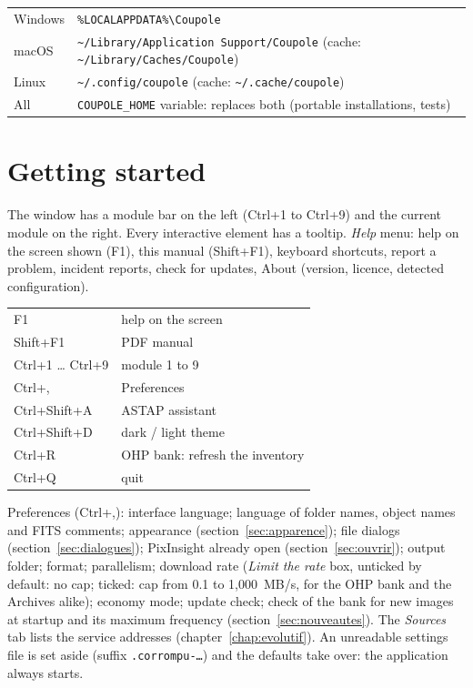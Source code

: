 \begin{center}\small
\begin{tabular}{@{}ll@{}}
\toprule
Windows & \texttt{\%LOCALAPPDATA\%\textbackslash Coupole}\\
macOS & \texttt{\textasciitilde/Library/Application Support/Coupole} (cache: \texttt{\textasciitilde/Library/Caches/Coupole})\\
Linux & \texttt{\textasciitilde/.config/coupole} (cache: \texttt{\textasciitilde/.cache/coupole})\\
All & \texttt{COUPOLE\_HOME} variable: replaces both (portable installations, tests)\\
\bottomrule
\end{tabular}
\end{center}

\section{Getting started}
The window has a module bar on the left (Ctrl+1 to Ctrl+9) and the current module on the right. Every interactive
element has a tooltip. \emph{Help} menu: help on the screen shown (F1), this manual (Shift+F1), keyboard shortcuts,
report a problem, incident reports, check for updates, About (version, licence, detected configuration).

\begin{center}\small
\begin{tabular}{@{}ll@{}}
\toprule
F1 & help on the screen\\ Shift+F1 & PDF manual\\ Ctrl+1 … Ctrl+9 & module 1 to 9\\ Ctrl+, & Preferences\\
Ctrl+Shift+A & ASTAP assistant\\ Ctrl+Shift+D & dark / light theme\\ Ctrl+R & OHP bank: refresh the inventory\\ Ctrl+Q & quit\\
\bottomrule
\end{tabular}
\end{center}

Preferences (Ctrl+,): interface language; language of folder names, object names and FITS comments;
appearance (section~\ref{sec:apparence}); file dialogs (section~\ref{sec:dialogues}); PixInsight already open (section~\ref{sec:ouvrir}); output folder; format; parallelism; download rate (\emph{Limit the rate} box, unticked by default: no cap; ticked: cap from 0.1 to 1,000~MB/s, for the OHP bank and the Archives alike); economy mode; update check; check of the bank for new images at startup and its maximum frequency (section~\ref{sec:nouveautes}). The \emph{Sources} tab lists the service
addresses (chapter~\ref{chap:evolutif}). An unreadable settings file is set aside (suffix \texttt{.corrompu-…}) and
the defaults take over: the application always starts.

